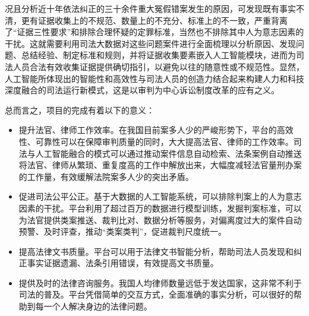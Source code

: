 况且分析近十年依法纠正的三十余件重大冤假错案发生的原因，可发现既有事实不清，更有证据收集上的不规范、数量上的不充分、标准上的不一致，严重背离了“证据三性要求”和排除合理怀疑的定罪标准，当然也不排除其中人为意志因素的干扰。这就需要利用司法大数据对这些问题案件进行全面梳理以分析原因、发现问题、总结经验、制定标准和规则，并将证据收集要素嵌入人工智能模块，进而为司法人员合法有效收集证据提供确切指引，以避免以往的随意性或不规范性。显然，人工智能所体现出的智能性和高效性与司法人员的创造力结合起来构建人力和科技深度融合的司法运行新模式，这是以审判为中心诉讼制度改革的应有之义。

总而言之，项目的完成有着以下的意义：
\begin{itemize}
	\item 提升法官、律师工作效率。在我国目前案多人少的严峻形势下，平台的高效性、可靠性可以在保障审判质量的同时，大大提高法官、律师的工作效率。司法与人工智能融合的模式可以通过推动案件信息自动检索、法条案例自动推送将法官、律师从繁琐、重复度高的工作中解放出来，大幅度减轻法官量刑办案的工作量，有效缓解法院案多人少的突出矛盾。
	\item 促进司法公平公正。基于大数据的人工智能系统，可以排除判案上的人为意志因素的干扰。平台利用了超过百万的数据进行模型训练，发掘判案标准，可以为法官提供类案推送、裁判比对、数据分析等服务，对偏离度过大的案件自动预警、及时评查，推动“类案类判”，促进裁判尺度统一。
	\item 提高法律文书质量。平台可以用于法律文书智能分析，帮助司法人员发现和纠正事实证据遗漏、法条引用错误，有效提高文书质量。
	\item 提供及时的法律咨询服务。我国人均律师数量远低于发达国家，这非常不利于司法的普及。平台凭借简单的交互方式，全面准确的事实分析，可以很好的帮助到每一个人解决身边的法律问题。
\end{itemize}

\iffalse
\begin{itemize}
	\item 在专业人员数量受限制的情况下，平台可以在保障审判质量的同时，利用人工智能算法来大大提升审判工作的效率。
	\item 排除人为意志因素对审判结果的干扰，利用司法大数据对判案制定统一的标准。
	\item 成为每一个人的法律咨询助手，平台提供了详细、全面的案件案情分析，能够很好地为每一个人提供法律知识，帮助大家维护自身权益。
	\item 提供了人工智能与司法人员结合的判案新模式，这将是未来的发展新模式。
\end{itemize}
\fi



